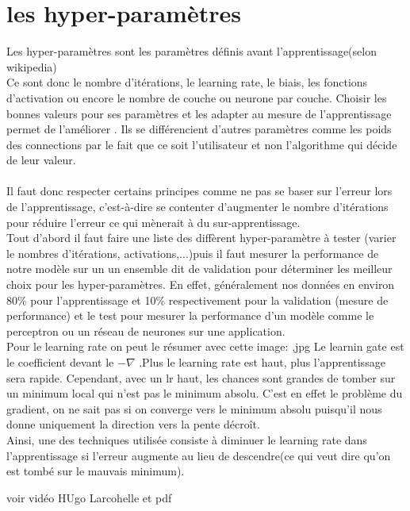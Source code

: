 \documentclass[openany,14pt,fleqn]{book} %
\begin{document}
\section{les hyper-paramètres}
Les hyper-paramètres sont les paramètres définis avant l'apprentissage(selon wikipedia)\\
Ce sont donc le nombre d'itérations, le learning rate, le biais, les fonctions d'activation ou encore le nombre de couche ou neurone par couche. Choisir les bonnes valeurs pour ses paramètres et les adapter au mesure de l'apprentissage permet de l'améliorer . Ils se différencient d'autres paramètres comme les poids des connections par le fait que ce soit l'utilisateur et non l'algorithme qui décide de leur valeur.\\ \\
Il faut donc respecter certains principes comme ne pas se baser sur l'erreur lors de l'apprentissage, c'est-à-dire se contenter d'augmenter le nombre d'itérations pour réduire l'erreur ce qui mènerait à du sur-apprentissage.\\
Tout d'abord il faut faire une liste des diffèrent hyper-paramètre à tester (varier le nombres d’itérations, activations,...)puis il faut mesurer la performance de notre modèle sur un un ensemble dit de validation pour déterminer les meilleur choix pour les hyper-paramètres. En effet, généralement nos données en environ 80\% 
pour l'apprentissage et 10\% respectivement pour la validation (mesure de performance) et le test pour mesurer la performance d'un modèle comme le perceptron ou un réseau de neurones sur une application. \cite{Hugo_Larochelle14}\\


Pour le learning rate on peut le résumer avec cette image: ,jpg
Le learnin gate est le coefficient devant le $-\nabla$ .Plus le learning rate est haut, plus l'apprentissage sera rapide. Cependant, avec un lr haut, les chances sont grandes de tomber sur un minimum local qui n'est pas le minimum absolu. C'est en effet le problème du gradient, on ne sait pas si on converge vers le minimum absolu puisqu'il nous donne uniquement la direction vers la pente décroît. \\
Ainsi, une des techniques utilisée consiste à diminuer le learning rate dans l'apprentissage si l'erreur augmente au lieu de descendre(ce qui veut dire qu'on est tombé sur le mauvais minimum). 


voir vidéo HUgo Larcohelle et pdf
\end{document}
